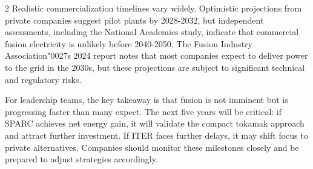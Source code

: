 \documentclass[10pt,a4paper]{article}
\newcommand{\BOApos}{{\BOQuoteFont\char"0027}}
\begin{document}
\begin{multicols}{2}
{\small Realistic commercialization timelines vary widely. Optimistic projections from private companies suggest pilot plants by 2028-2032, but independent assessments, including the National Academies study, indicate that commercial fusion electricity is unlikely before 2040-2050. The Fusion Industry Association\BOApos{}s 2024 report notes that most companies expect to deliver power to the grid in the 2030s, but these projections are subject to significant technical and regulatory risks.}\par
{\small For leadership teams, the key takeaway is that fusion is not imminent but is progressing faster than many expect. The next five years will be critical: if SPARC achieves net energy gain, it will validate the compact tokamak approach and attract further investment. If ITER faces further delays, it may shift focus to private alternatives. Companies should monitor these milestones closely and be prepared to adjust strategies accordingly.}\par
\end{multicols}
\label{chap:1:end}
\end{document}
